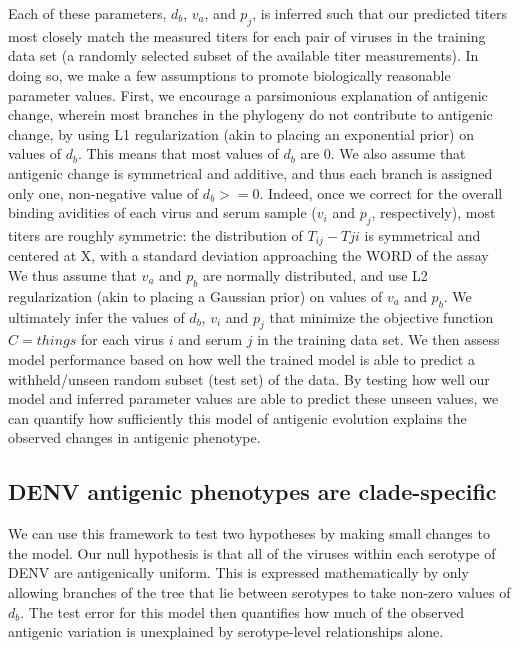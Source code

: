 \documentclass[11pt,oneside,letterpaper]{article}
\begin{document}
Each of these parameters, $d_b$, $v_a$, and $p_j$, is inferred such that our predicted titers most closely match the measured titers for each pair of viruses in the training data set (a randomly selected subset of the available titer measurements).
In doing so, we make a few assumptions to promote biologically reasonable parameter values.
First, we encourage a parsimonious explanation of antigenic change, wherein most branches in the phylogeny do not contribute to antigenic change, by using L1 regularization (akin to placing an exponential prior) on values of $d_b$.
This means that most values of $d_b$ are 0.
We also assume that antigenic change is symmetrical and additive, and thus each branch is assigned only one, non-negative value of $d_b >= 0$.
Indeed, once we correct for the overall binding avidities of each virus and serum sample ($v_i$ and $p_j$, respectively), most titers are roughly symmetric: the distribution of $T_{ij} - T{ji}$ is symmetrical and centered at X, with a standard deviation approaching the WORD of the assay %
We thus assume that $v_a$ and $p_b$ are normally distributed, and use L2 regularization (akin to placing a Gaussian prior) on values of $v_a$ and $p_b$.
We ultimately infer the values of $d_b$, $v_i$ and $p_j$ that minimize the objective function $C = things$ for each virus $i$ and serum $j$ in the training data set.
We then assess model performance based on how well the trained model is able to predict a withheld/unseen random subset (test set) of the data.
By testing how well our model and inferred parameter values are able to predict these unseen values, we can quantify how sufficiently this model of antigenic evolution explains the observed changes in antigenic phenotype.

\subsection*{DENV antigenic phenotypes are clade-specific}
We can use this framework to test two hypotheses by making small changes to the model.
Our null hypothesis is that all of the viruses within each serotype of DENV are antigenically uniform.
This is expressed mathematically by only allowing branches of the tree that lie between serotypes to take non-zero values of $d_b$.
The test error for this model then quantifies how much of the observed antigenic variation is unexplained by serotype-level relationships alone.
\end{document}
